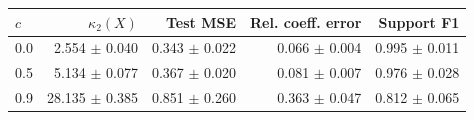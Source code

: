 \begin{tabular}{lrrrr}
\toprule
$c$ & $\kappa_2(X)$ & Test MSE & Rel. coeff. error & Support F1 \\
\midrule
0.0 & 2.554 $\pm$ 0.040 & 0.343 $\pm$ 0.022 & 0.066 $\pm$ 0.004 & 0.995 $\pm$ 0.011 \\
0.5 & 5.134 $\pm$ 0.077 & 0.367 $\pm$ 0.020 & 0.081 $\pm$ 0.007 & 0.976 $\pm$ 0.028 \\
0.9 & 28.135 $\pm$ 0.385 & 0.851 $\pm$ 0.260 & 0.363 $\pm$ 0.047 & 0.812 $\pm$ 0.065 \\
\bottomrule
\end{tabular}
